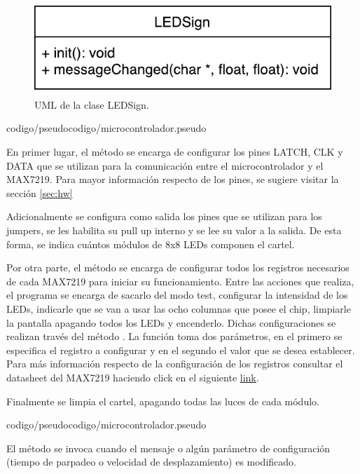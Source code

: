 \begin{figure}[!ht]
	\centering
	\includegraphics[scale=0.8]{imagenes/uml/LEDSign.pdf}
	\caption{UML de la clase LEDSign.}
	\label{uml:ledSign}
\end{figure}

 {codigo/pseudocodigo/microcontrolador.pseudo}

En primer lugar, el método  se encarga de configurar los pines LATCH, CLK y DATA que se utilizan para la comunicación entre el microcontrolador y el MAX7219.
Para mayor información respecto de los pines, se sugiere visitar la sección \ref{sec:hw} %

Adicionalmente se configura como salida los pines que se utilizan para los jumpers, se les habilita su pull up interno y se lee su valor a la salida.
De esta forma, se indica cuántos módulos de 8x8 LEDs componen el cartel.

Por otra parte, el método se encarga de configurar todos los registros necesarios de cada MAX7219 para iniciar su funcionamiento.
Entre las acciones que realiza, el programa se encarga de sacarlo del modo test, configurar la intensidad de los LEDs, indicarle que se van a usar las ocho columnas que posee el chip, limpiarle la pantalla apagando todos los LEDs y encenderlo.
Dichas configuraciones se realizan través del método .
La función toma dos parámetros, en el primero se especifica el registro a configurar y en el segundo el valor que se desea establecer.
Para más información respecto de la configuración de los registros consultar el datasheet del MAX7219 haciendo click en el siguiente \href{https://datasheets.maximintegrated.com/en/ds/MAX7219-MAX7221.pdf}{link}.

Finalmente se limpia el cartel, apagando todas las luces de cada módulo.

 {codigo/pseudocodigo/microcontrolador.pseudo}

El método  se invoca cuando el mensaje o algún parámetro de configuración (tiempo de parpadeo o velocidad de desplazamiento) es modificado.

